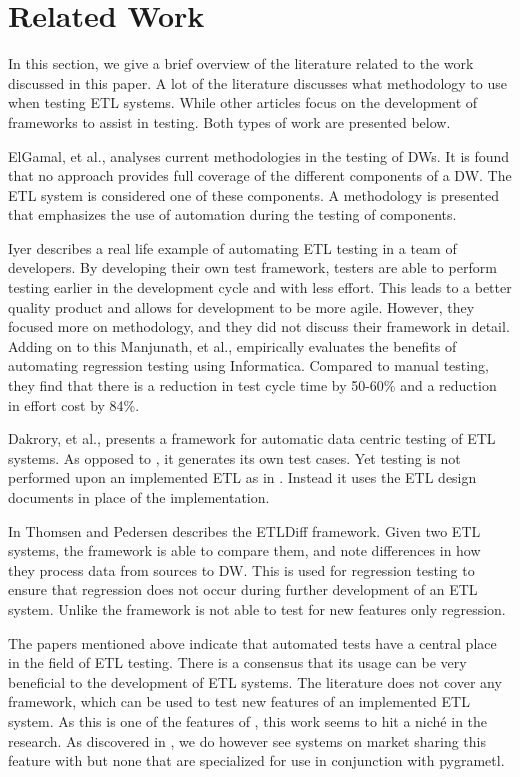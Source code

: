 \section{Related Work}\label{sect:RelatedWork}
In this section, we give a brief overview of the literature related to the work discussed in this paper. A lot of the literature discusses what methodology to use when testing ETL systems. While other articles focus on the development of frameworks to assist in testing. Both types of work are presented below.

ElGamal, et al., \cite{elgamal2012towards} analyses current methodologies in the testing of DWs. It is found that no approach provides full coverage of the different components of a DW. The ETL system is considered one of these components. A methodology is presented that emphasizes the use of automation during the testing of components.

Iyer \cite{subuiyer2014} describes a real life example of automating ETL testing in a team of developers. By developing their own test framework, testers are able to perform testing earlier in the development cycle and with less effort. This leads to a better quality product and allows for development to be more agile. However, they focused more on methodology, and they did not discuss their framework in detail. Adding on to this Manjunath, et al., \cite{manjunath2012case} empirically evaluates the benefits of automating regression testing using Informatica. Compared to manual testing, they find that there is a reduction in test cycle time by 50-60\% and a reduction in effort cost by 84\%.

Dakrory, et al., \cite{dakroryautomated} presents a framework for automatic data centric testing of ETL systems. As opposed to \FW{}, it generates its own test cases. Yet testing is not performed upon an implemented ETL as in \FW{}. Instead it uses the ETL design documents in place of the implementation.

In \cite{thomsen2006etldiff} Thomsen and Pedersen describes the ETLDiff framework. Given two ETL systems, the framework is able to compare them, and note differences in how they process data from sources to DW. This is used for regression testing to ensure that regression does not occur during further development of an ETL system. Unlike \FW{} the framework is not able to test for new features only regression.

The papers mentioned above indicate that automated tests have a central place in the field of ETL testing. There is a consensus that its usage can be very beneficial to the development of ETL systems. The literature does not cover any framework, which can be used to test new features of an implemented ETL system. As this is one of the features of \FW{}, this work seems to hit a niché in the research. As discovered in , we do however see systems on market sharing this feature with \FW{} but none that are specialized for use in conjunction with pygrametl.